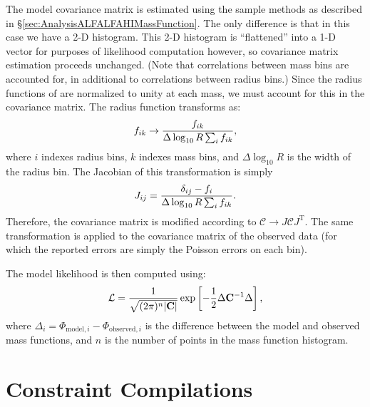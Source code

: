 The model covariance matrix is estimated using the sample methods as described in \S\ref{sec:AnalysisALFALFAHIMassFunction}. The only difference is that in this case we have a 2-D histogram. This 2-D histogram is ``flattened'' into a 1-D vector for purposes of likelihood computation however, so covariance matrix estimation proceeds unchanged. (Note that correlations between mass bins are accounted for, in additional to correlations between radius bins.) Since the radius functions of \cite{shen_size_2003} are normalized to unity at each mass, we must account for this in the covariance matrix. The radius function transforms as:
\begin{equation}
 f_{ik} \rightarrow {f_{ik} \over \Delta \log_{10} R \sum_i f_{ik} },
\end{equation}
where $i$ indexes radius bins, $k$ indexes mass bins, and $\Delta \log_{10} R$ is the width of the radius bin. The Jacobian of this transformation is simply
\begin{equation}
 J_{ij} = {\delta_{ij} - f_i \over  \Delta \log_{10} R \sum_i f_{ik}}.
\end{equation}
Therefore, the covariance matrix is modified according to $\mathcal{C} \rightarrow J \mathcal{C} J^\mathrm{T}$. The same transformation is applied to the covariance matrix of the observed data (for which the reported errors are simply the Poisson errors on each bin).

The model likelihood is then computed using:
\begin{equation}
 \mathcal{L} = {1 \over \sqrt{(2 \pi)^n |\mathbf{C}|}} \exp\left[ -{1\over 2} \Delta \mathbf{C}^{-1} \Delta \right],
\end{equation}
where $\Delta_i = \Phi_{\mathrm{model}, i} - \Phi_{\mathrm{observed}, i}$ is the difference between the model and observed mass functions, and $n$ is the number of points in the mass function histogram.

\section{Constraint Compilations}

